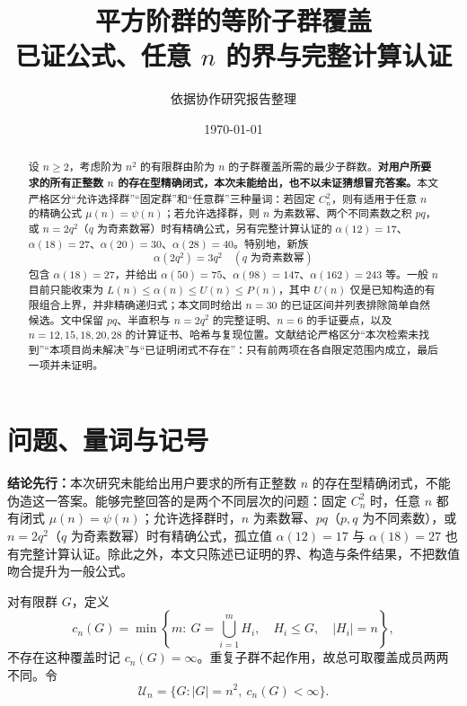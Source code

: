 \documentclass[11pt,a4paper]{article}
\title{\bfseries 平方阶群的等阶子群覆盖\\[0.35em]
\Large 已证公式、任意 \texorpdfstring{$n$}{n} 的界与完整计算认证}
\author{依据协作研究报告整理}
\date{\today}
\numberwithin{equation}{section}
\theoremstyle{plain}
\theoremstyle{definition}
\theoremstyle{remark}
\newcommand{\calU}{\mathcal{U}}
\begin{document}
\maketitle
\begin{abstract}
\noindent 设 $n\ge2$，考虑阶为 $n^2$ 的有限群由阶为 $n$ 的子群覆盖所需的最少子群数。\textbf{对用户所要求的所有正整数 $n$ 的存在型精确闭式，本次未能给出，也不以未证猜想冒充答案。}本文严格区分“允许选择群”“固定群”和“任意群”三种量词：若固定 $C_n^2$，则有适用于任意 $n$ 的精确公式 $\mu(n)=\psi(n)$；若允许选择群，则 $n$ 为素数幂、两个不同素数之积 $pq$，或 $n=2q^2$（$q$ 为奇素数幂）时有精确公式，另有完整计算认证的 $\alpha(12)=17$、$\alpha(18)=27$、$\alpha(20)=30$、$\alpha(28)=40$。特别地，新族
\[
\alpha(2q^2)=3q^2\quad(q\text{ 为奇素数幂})
\]
包含 $\alpha(18)=27$，并给出 $\alpha(50)=75$、$\alpha(98)=147$、$\alpha(162)=243$ 等。一般 $n$ 目前只能收束为 $L(n)\le\alpha(n)\le U(n)\le P(n)$，其中 $U(n)$ 仅是已知构造的有限组合上界，并非精确递归式；本文同时给出 $n=30$ 的已证区间并列表排除简单自然候选。文中保留 $pq$、半直积与 $n=2q^2$ 的完整证明、$n=6$ 的手证要点，以及 $n=12,15,18,20,28$ 的计算证书、哈希与复现位置。文献结论严格区分“本次检索未找到”“本项目尚未解决”与“已证明闭式不存在”：只有前两项在各自限定范围内成立，最后一项并未证明。
\end{abstract}

\tableofcontents
\clearpage

\section{问题、量词与记号}
\textbf{结论先行：}本次研究未能给出用户要求的所有正整数 $n$ 的存在型精确闭式，不能伪造这一答案。能够完整回答的是两个不同层次的问题：固定 $C_n^2$ 时，任意 $n$ 都有闭式 $\mu(n)=\psi(n)$；允许选择群时，$n$ 为素数幂、$pq$（$p,q$ 为不同素数），或 $n=2q^2$（$q$ 为奇素数幂）时有精确公式，孤立值 $\alpha(12)=17$ 与 $\alpha(18)=27$ 也有完整计算认证。除此之外，本文只陈述已证明的界、构造与条件结果，不把数值吻合提升为一般公式。

对有限群 $G$，定义
\begin{equation}
 c_n(G)=\min\left\{m:\ G=\bigcup_{i=1}^{m}H_i,\quad H_i\le G,\quad |H_i|=n\right\},
\end{equation}
不存在这种覆盖时记 $c_n(G)=\infty$。重复子群不起作用，故总可取覆盖成员两两不同。令
\begin{equation}
 \calU_n=\{G:|G|=n^2,\ c_n(G)<\infty\}.
\end{equation}
\end{document}
